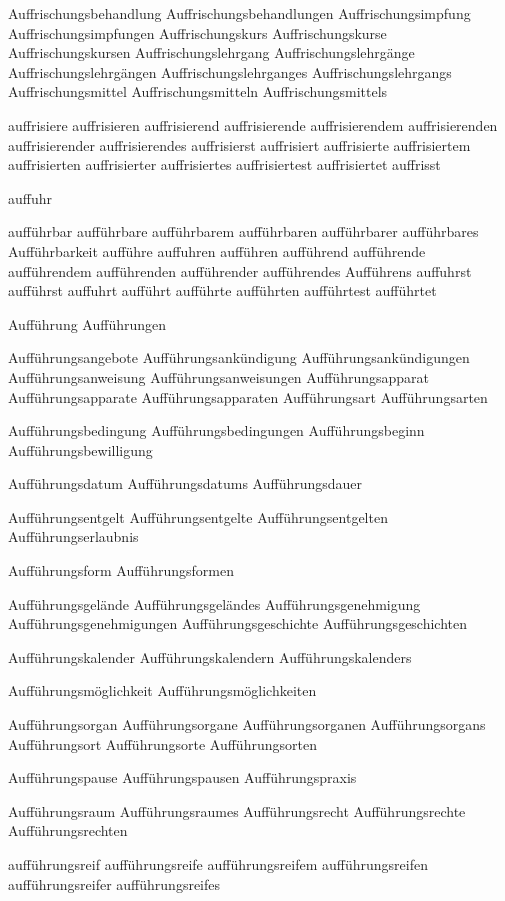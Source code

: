Auffrischungsbehandlung
Auffrischungsbehandlungen
Auffrischungsimpfung
Auffrischungsimpfungen
Auffrischungskurs
Auffrischungskurse
Auffrischungskursen
Auffrischungslehrgang
Auffrischungslehrgänge
Auffrischungslehrgängen
Auffrischungslehrganges
Auffrischungslehrgangs
Auffrischungsmittel
Auffrischungsmitteln
Auffrischungsmittels

auffrisiere
auffrisieren
auffrisierend
auffrisierende
auffrisierendem
auffrisierenden
auffrisierender
auffrisierendes
auffrisierst
auffrisiert
auffrisierte
auffrisiertem
auffrisierten
auffrisierter
auffrisiertes
auffrisiertest
auffrisiertet
auffrisst

auffuhr

aufführbar
aufführbare
aufführbarem
aufführbaren
aufführbarer
aufführbares
Aufführbarkeit
aufführe
auffuhren
aufführen
aufführend
aufführende
aufführendem
aufführenden
aufführender
aufführendes
Aufführens
auffuhrst
aufführst
auffuhrt
aufführt
aufführte
aufführten
aufführtest
aufführtet

Aufführung
Aufführungen

Aufführungsangebote
Aufführungsankündigung
Aufführungsankündigungen
Aufführungsanweisung
Aufführungsanweisungen
Aufführungsapparat
Aufführungsapparate
Aufführungsapparaten
Aufführungsart
Aufführungsarten

Aufführungsbedingung
Aufführungsbedingungen
Aufführungsbeginn
Aufführungsbewilligung

Aufführungsdatum
Aufführungsdatums
Aufführungsdauer

Aufführungsentgelt
Aufführungsentgelte
Aufführungsentgelten
Aufführungserlaubnis

Aufführungsform
Aufführungsformen

Aufführungsgelände
Aufführungsgeländes
Aufführungsgenehmigung
Aufführungsgenehmigungen
Aufführungsgeschichte
Aufführungsgeschichten

Aufführungskalender
Aufführungskalendern
Aufführungskalenders

Aufführungsmöglichkeit
Aufführungsmöglichkeiten

Aufführungsorgan
Aufführungsorgane
Aufführungsorganen
Aufführungsorgans
Aufführungsort
Aufführungsorte
Aufführungsorten

Aufführungspause
Aufführungspausen
Aufführungspraxis

Aufführungsraum
Aufführungsraumes
Aufführungsrecht
Aufführungsrechte
Aufführungsrechten

aufführungsreif
aufführungsreife
aufführungsreifem
aufführungsreifen
aufführungsreifer
aufführungsreifes

